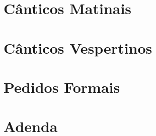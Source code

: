 
\morningPartSettings

\part{Cânticos Matinais}

\morningChapterSettings



\morningSettingsRestore

\eveningPartSettings

\part{Cânticos Vespertinos}

\eveningChapterSettings



\eveningSettingsRestore

\requestsPartSettings

\part{Pedidos Formais}

\requestsChapterSettings



\requestsSettingsRestore


\makeatletter
{}
\pagestyle{normalpage}
\makeatother

\part{Adenda}

\artoptfalse


